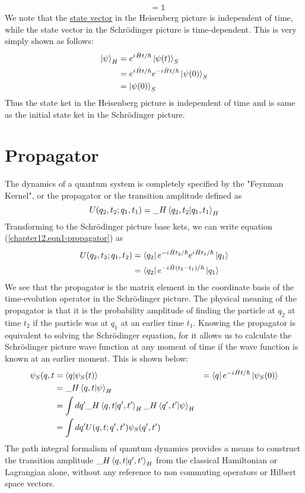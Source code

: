\begin{enumerate}
\begin{align}
		&= \mathbb{1}
	\end{align}
	We note that the \underline{state vector} in the Heisenberg picture is independent of time, while the state vector in the Schr\"{o}dinger picture is time-dependent. This is very simply shown as follows:
	\begin{align}
		\ket{\psi}_H &= e^{{i\mkern1mu} \hat{H}t/\hbar} \ket{\psi(t)}_S \\
		&= e^{{i\mkern1mu} \hat{H}t/\hbar} e^{-{i\mkern1mu} \hat{H}t/\hbar} \ket{\psi(0)}_S\\
		&= \ket{\psi(0)}_S
	\end{align}
	Thus the state ket in the Heisenberg picture is independent of time and is same as the initial state ket in the Schr\"{o}dinger picture.\\
	
	
	\section{Propagator}
	The dynamics of a quantum system is completely specified by the "Feynman Kernel", or the propagator or the transition amplitude defined as
	\begin{equation}
		U(q_2, t_2; q_1, t_1) = {\_H}\braket{q_2, t_2}{q_1, t_1}_H
		\label{chapter12.eqn1-propagator}
	\end{equation}
	Transforming to the Schr\"{o}dinger picture base kets, we can write equation (\ref{chapter12.eqn1-propagator}) as
	\begin{align}
		U(q_2, t_2; q_1, t_2) 
		&= \bra{q_2}e^{-{i\mkern1mu} \hat{H}t_2/\hbar} e^{{i\mkern1mu} \hat{H}t_1/\hbar} \ket{q_1} \nonumber \\
		&= \bra{q_2}e^{-{i\mkern1mu} \hat{H}(t_2-t_1)/\hbar} \ket{q_1} \label{chapter12.eqn2-propagator}
	\end{align}
	We see that the propagator is the matrix element in the coordinate basis of the time-evolution operator in the Schr\"{o}dinger picture. The physical meaning of the propagator is that it is the probability amplitude of finding the particle at $q_2$ at time $t_2$ if the particle was at $q_1$ at an earlier time $t_1$. Knowing the propagator is equivalent to solving the Schr\"{o}dinger equation, for it allows us to calculate the Schr\"{o}dinger picture wave function at any moment of time if the wave function is known at an earlier moment. This is shown below:
	\begin{align}
		\psi_S(q,t &= \braket{q}{\psi_S(t)} \
		&= \bra{q}e^{-{i\mkern1mu} \hat{H}t/\hbar} \ket{\psi_S(0)} \\
		&= {\_H}\braket{q,t}{\psi}_H \\
		&= \int dq^\prime {\_H}\braket{q,t}{q^\prime, t^\prime}_H {\_H}\braket{q^\prime, t^\prime}{\psi}_H \\
		&= \int dq^\prime U(q,t;q^\prime, t^\prime) \psi_S(q^\prime,t^\prime)
	\end{align}
	The path integral formalism of quantum dynamics provides a means to construct the transition amplitude ${\_H}\braket{q,t}{q^\prime, t^\prime}_H$ from the classical Hamiltonian or Lagrangian alone, without any reference to non commuting operators or Hilbert space vectors.\\
	

\end{enumerate}
